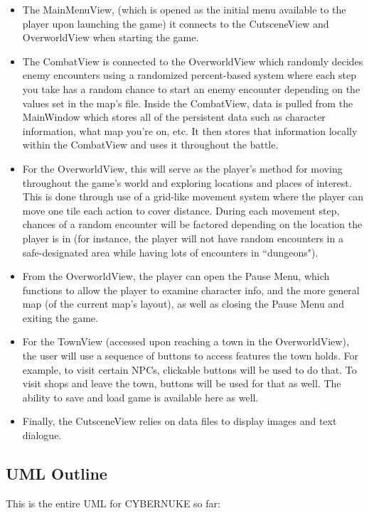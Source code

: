 \documentclass[10pt,conference,onecolumn,compsoc]{IEEEtran}
\begin{document}
\begin{itemize}

\item The MainMenuView, (which is opened as the initial menu available to the player upon launching the game) it connects to the CutsceneView and OverworldView when starting the game.

\item The CombatView is connected to the OverworldView which randomly decides enemy encounters using a randomized percent-based system where each step you take has a random chance to start an enemy encounter depending on the values set in the map's file. Inside the CombatView, data is pulled from the MainWindow which stores all of the persistent data such as character information, what map you're on, etc. It then stores that information locally within the CombatView and uses it throughout the battle.

\item For the OverworldView, this will serve as the player's method for moving throughout the game's world and exploring locations and places of interest. This is done through use of a grid-like movement system where the player can move one tile each action to cover distance. During each movement step, chances of a random encounter will be factored depending on the location the player is in (for instance, the player will not have random encounters in a safe-designated area while having lots of encounters in ``dungeons").

\item From the OverworldView, the player can open the Pause Menu, which functions to allow the player to examine character info, and the more general map (of the current map's layout), as well as closing the Pause Menu and exiting the game.

\item For the TownView (accessed upon reaching a town in the OverworldView), the user will use a sequence of buttons to access features the town holds. For example, to visit certain NPCs, clickable buttons will be used to do that. To visit shops and leave the town, buttons will be used for that as well. The ability to save and load game is available here as well.

\item Finally, the CutsceneView relies on data files to display images and text dialogue.

\end{itemize}

\subsection{UML Outline}
This is the entire UML for CYBERNUKE so far:
\end{document}
